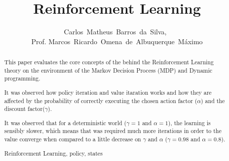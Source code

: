 \documentclass[journal]{IEEEtran}
\begin{document}
  \title{Reinforcement Learning}
  \author{Carlos~Matheus~Barros~da~Silva,~
  \\Prof. Marcos~Ricardo~Omena~de~Albuquerque~Máximo}


\maketitle



\begin{abstract}

This paper evaluates the core concepts of the behind the Reinforcement Learning
theory on the environment of the Markov Decision Process (MDP) and Dynamic
programming.

It was observed how policy iteration and value itaration works and how they are
affected by the probability of correctly executing the chosen action factor
($\alpha$) and the discount factor($\gamma$).

It was observed that for a deterministic world ($\gamma = 1$ and $\alpha = 1$),
the learning is sensibly slower, which means that was required much more
iterations in order to the value converge when compared to a little decrease
on $\gamma$ and $\alpha$ ($\gamma = 0.98$ and $\alpha = 0.8$).

\begin{IEEEkeywords}
    Reinforcement Learning, policy, states
\end{IEEEkeywords}
\end{abstract}

\IEEEpeerreviewmaketitle
\end{document}
